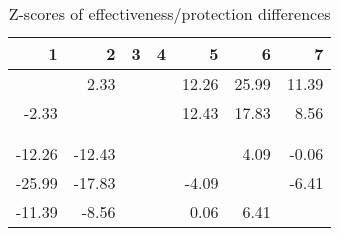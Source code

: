 \begin{table}[ht]
\centering
\begin{tabular}{rrrrrrr}
  \hline
1 & 2 & 3 & 4 & 5 & 6 & 7 \\ 
  \hline
 & 2.33 &  &  & 12.26 & 25.99 & 11.39 \\ 
  -2.33 &  &  &  & 12.43 & 17.83 & 8.56 \\ 
   &  &  &  &  &  &  \\ 
   &  &  &  &  &  &  \\ 
  -12.26 & -12.43 &  &  &  & 4.09 & -0.06 \\ 
  -25.99 & -17.83 &  &  & -4.09 &  & -6.41 \\ 
  -11.39 & -8.56 &  &  & 0.06 & 6.41 &  \\ 
   \hline
\end{tabular}
\caption{Z-scores of effectiveness/protection differences} 
\end{table}
